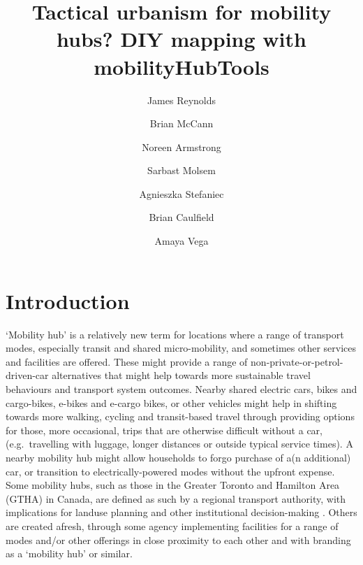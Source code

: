 \documentclass[preprint, 3p,
authoryear]{elsarticle} %
\begin{document}
\begin{frontmatter}

  \title{Tactical urbanism for mobility hubs? DIY mapping with
mobilityHubTools}
    \author[]{James Reynolds%
  }
    \author[]{Brian McCann%
  }
    \author[]{Noreen Armstrong%
  }
    \author[]{Sarbast Molsem%
  }
    \author[]{Agnieszka Stefaniec%
  }
    \author[]{Brian Caulfield%
  }
    \author[]{Amaya Vega%
  }
  
  \begin{abstract}
  
  \end{abstract}
  
 \end{frontmatter}

\section{Introduction}\label{introduction}

`Mobility hub' is a relatively new term for locations where a range of
transport modes, especially transit and shared micro-mobility, and
sometimes other services and facilities are offered. These might provide
a range of non-private-or-petrol-driven-car alternatives that might help
towards more sustainable travel behaviours and transport system
outcomes. Nearby shared electric cars, bikes and cargo-bikes, e-bikes
and e-cargo bikes, or other vehicles might help in shifting towards more
walking, cycling and transit-based travel through providing options for
those, more occasional, trips that are otherwise difficult without a
car, (e.g.~travelling with luggage, longer distances or outside typical
service times). A nearby mobility hub might allow households to forgo
purchase of a(n additional) car, or transition to electrically-powered
modes without the upfront expense. Some mobility hubs, such as those in
the Greater Toronto and Hamilton Area (GTHA) in Canada, are defined as
such by a regional transport authority, with implications for landuse
planning and other institutional decision-making
\citep{Salsberg:2010aa, Engel-Yan:2012aa}. Others are created afresh,
through some agency implementing facilities for a range of modes and/or
other offerings in close proximity to each other and with branding as a
`mobility hub' or similar.
\end{document}
